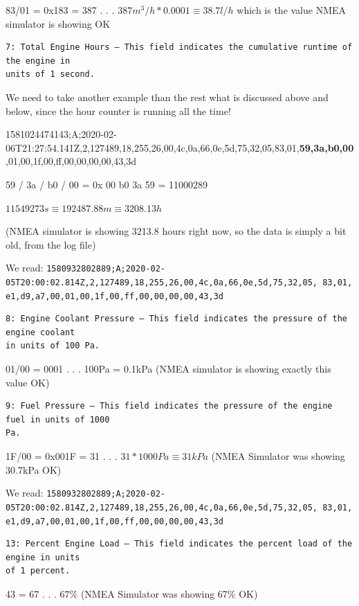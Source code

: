 \documentclass[11pt]{article}
\begin{document}
83/01 = 0x183 = 387 . . . \(387m^{3}/h * 0.0001 \equiv 38.7l/h\) which
is the value NMEA simulator is showing OK

    \begin{verbatim}
7: Total Engine Hours – This field indicates the cumulative runtime of the engine in
units of 1 second.
\end{verbatim}

We need to take another example than the rest what is discussed above
and below, since the hour counter is running all the time!

1581024474143;A;2020-02-06T21:27:54.141Z,2,127489,18,255,26,00,4c,0a,66,0e,5d,75,32,05,83,01,\textbf{59,3a,b0,00},01,00,1f,00,ff,00,00,00,00,43,3d

59 / 3a / b0 / 00 = 0x 00 b0 3a 59 = 11000289

\(11549273s \equiv 192487.88m \equiv 3208.13h\)

(NMEA simulator is showing 3213.8 hours right now, so the data is simply
a bit old, from the log file)

    We read:
\texttt{1580932802889;A;2020-02-05T20:00:02.814Z,2,127489,18,255,26,00,4c,0a,66,0e,5d,75,32,05,\ 83,01,e1,d9,a7,00,01,00,1f,00,ff,00,00,00,00,43,3d}

\begin{verbatim}
8: Engine Coolant Pressure – This field indicates the pressure of the engine coolant
in units of 100 Pa.
\end{verbatim}

01/00 = 0001 . . . 100Pa = 0.1kPa (NMEA simulator is showing exactly
this value OK)

    \begin{verbatim}
9: Fuel Pressure – This field indicates the pressure of the engine fuel in units of 1000
Pa.
\end{verbatim}

1F/00 = 0x001F = 31 . . . \(31*1000Pa\equiv31kPa\) (NMEA Simulator was
showing 30.7kPa OK)

    We read:
\texttt{1580932802889;A;2020-02-05T20:00:02.814Z,2,127489,18,255,26,00,4c,0a,66,0e,5d,75,32,05,\ 83,01,e1,d9,a7,00,01,00,1f,00,ff,00,00,00,00,43,3d}

\begin{verbatim}
13: Percent Engine Load – This field indicates the percent load of the engine in units
of 1 percent.
\end{verbatim}

43 = 67 . . . \(67\%\) (NMEA Simulator was showing 67\% OK)
\end{document}
